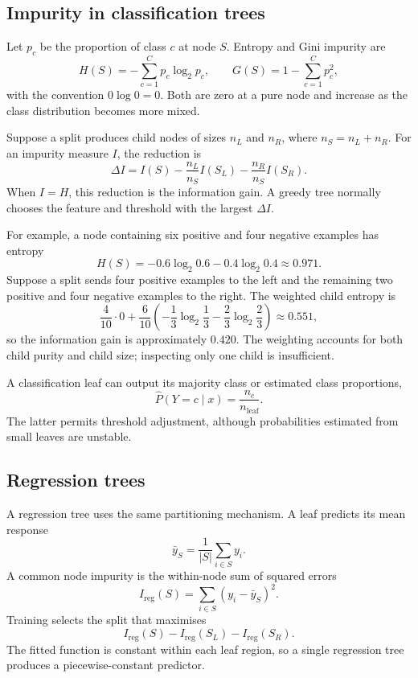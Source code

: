 \subsection{Impurity in classification trees}

Let $p_c$ be the proportion of class $c$ at node $S$. Entropy and Gini
impurity are
\[
H(S)=-\sum_{c=1}^{C}p_c\log_2 p_c,
\qquad
G(S)=1-\sum_{c=1}^{C}p_c^2,
\]
with the convention $0\log 0=0$. Both are zero at a pure node and increase as
the class distribution becomes more mixed.

Suppose a split produces child nodes of sizes $n_L$ and $n_R$, where
$n_S=n_L+n_R$. For an impurity measure $I$, the reduction is
\[
\Delta I
=I(S)-\frac{n_L}{n_S}I(S_L)
-\frac{n_R}{n_S}I(S_R).
\]
When $I=H$, this reduction is the information gain. A greedy tree normally
chooses the feature and threshold with the largest $\Delta I$.

For example, a node containing six positive and four negative examples has
entropy
\[
H(S)=-0.6\log_2 0.6-0.4\log_2 0.4\approx0.971.
\]
Suppose a split sends four positive examples to the left and the remaining two
positive and four negative examples to the right. The weighted child entropy is
\[
\frac{4}{10}\cdot0+
\frac{6}{10}\left(-\frac13\log_2\frac13-
\frac23\log_2\frac23\right)
\approx0.551,
\]
so the information gain is approximately $0.420$. The weighting accounts for
both child purity and child size; inspecting only one child is insufficient.

A classification leaf can output its majority class or estimated class
proportions,
\[
\widehat P(Y=c\mid x)=\frac{n_c}{n_{\mathrm{leaf}}}.
\]
The latter permits threshold adjustment, although probabilities estimated from
small leaves are unstable.

\subsection{Regression trees}

A regression tree uses the same partitioning mechanism. A leaf predicts its
mean response
\[
\bar y_S=\frac{1}{|S|}\sum_{i\in S}y_i.
\]
A common node impurity is the within-node sum of squared errors
\[
I_{\mathrm{reg}}(S)=
\sum_{i\in S}(y_i-\bar y_S)^2.
\]
Training selects the split that maximises
\[
I_{\mathrm{reg}}(S)
-I_{\mathrm{reg}}(S_L)
-I_{\mathrm{reg}}(S_R).
\]
The fitted function is constant within each leaf region, so a single regression
tree produces a piecewise-constant predictor.

